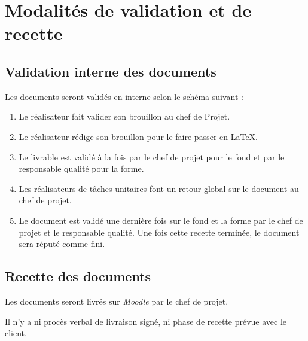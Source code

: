 \section{Modalités de validation et de recette}

\subsection{Validation interne des documents}

Les documents seront validés en interne selon le schéma suivant : 
\begin{enumerate}
\item Le réalisateur fait valider son brouillon au chef de Projet.
\item Le réalisateur rédige son brouillon pour le faire passer en \LaTeX.
\item Le livrable est validé à la fois par le chef de projet pour le fond et
    par le responsable qualité pour la forme.
\item Les réalisateurs de tâches unitaires font un retour global sur le document
    au chef de projet.
\item Le document est validé une dernière fois sur le fond et la forme par le
    chef de projet et le responsable qualité. Une fois cette recette terminée,
    le document sera réputé comme fini.
\end{enumerate} 

\subsection{Recette des documents}

Les documents seront livrés sur \textsl{Moodle} par le chef de projet. 


Il n'y a ni procès verbal de livraison signé, ni phase de recette prévue avec
le client.
